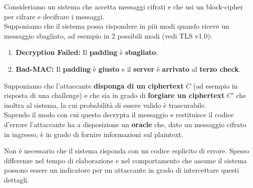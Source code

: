 \begin{definition}\label{def:padoracle}
Consideriamo un sistema che accetta messaggi cifrati e che usi un block-cipher per cifrare e decifrare i messaggi.\\
Supponiamo che il sistema possa rispondere in più modi quando riceve un messaggio sbagliato, ad esempio in 2 possibili modi (vedi TLS v1.0):
\begin{enumerate}
    \item \textbf{Decryption Failed:} Il \textbf{padding} è \textbf{sbagliato}.
    \item \textbf{Bad-MAC:} Il \textbf{padding} è \textbf{giusto} e il \textbf{server} è \textbf{arrivato} al \textbf{terzo check}.
\end{enumerate}
Supponiamo che l'attaccante \textbf{disponga di un ciphertext} $C$ (ad esempio in risposta di una challenge) e che sia in grado di \textbf{forgiare un ciphertext} $C'$ che inoltra al sistema, la cui probabilità di essere valido è trascurabile\footnotemark.\\
Sapendo il modo con cui questo decrypta il messaggio e restituisce il codice d'errore l'attaccante ha a disposizione un \textbf{oracle} che, dato un messaggio cifrato in ingresso, è in grado di fornire informazioni sul plaintext.
\end{definition}
\begin{note}
Non è necessario che il sistema risponda con un codice esplicito di errore. Spesso differenze nel tempo di elaborazione e nel comportamento che assume il sistema possono essere un indicatore per un attaccante in grado di intercettare questi dettagli.
\end{note}
